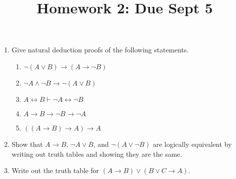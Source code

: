 \documentclass[12pt]{amsart}
\theoremstyle{definition}
\begin{document}
\title{Homework 2: Due Sept 5}

\maketitle

\begin{enumerate}
	\item Give natural deduction proofs of the following statements. 

	\begin{enumerate}

	\item $\neg(A \lor B) \to (A \to \neg B)$ 
	\item $\neg A \land \neg B \to \neg (A \lor B)$
	\item $A \leftrightarrow B \vdash \neg A \leftrightarrow \neg B$
	\item $A \to B \to \neg B \to \neg A$
	\item $((A \to B) \to A) \to A$
	
	\end{enumerate}

	\item Show that $A \to B$, $\neg A \lor B$, and $\neg (A \lor \neg B)$ are logically 
		equivalent by writing out truth tables and showing they are the same.

	\item Write out the truth table for $(A \to B) \lor (B \lor C \to A)$. 

\end{enumerate}
\end{document}
